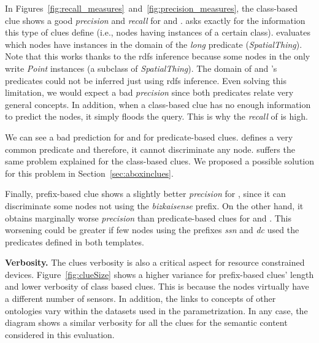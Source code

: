 In Figures~\ref{fig:recall_measures}~and~\ref{fig:precision_measures}, the class-based clue shows a good \emph{precision} and \emph{recall} for \tplone{} and \tpltwo{}.
\tplone{} asks exactly for the information this type of clues define (i.e., nodes having instances of a certain class).
\tpltwo{} evaluates which nodes have instances in the domain of the \emph{long} predicate (\emph{SpatialThing}).
Note that this works thanks to the \acs{rdfs} inference because some nodes in the \Space{} only write \emph{Point} instances (a subclass of \emph{SpatialThing}).
The domain of \tplthree{} and \tplfive{}'s predicates could not be inferred just using \acs{rdfs} inference. %
Even solving this limitation, we would expect a bad \emph{precision} since both predicates relate very general concepts.
In addition, when a class-based clue has no enough information to predict the nodes, it simply floods the query.
This is why the \emph{recall} of \tplfour{} is high.





We can see a bad prediction for \tplone{} and \tplfour{} for predicate-based clues.
\tplone{} defines a very common predicate and therefore, it cannot discriminate any node.
\tplfour{} suffers the same problem explained for the class-based clues.
We proposed a possible solution for this problem in Section~\ref{sec:aboxinclues}.

Finally, prefix-based clue shows a slightly better \emph{precision} for \tplfour{}, since it can discriminate some nodes not using the \emph{bizkaisense} prefix.
On the other hand, it obtains marginally worse \emph{precision} than predicate-based clues for \tplthree{} and \tplfive{}.
This worsening could be greater if few nodes using the prefixes \emph{ssn} and \emph{dc} used the predicates defined in both templates.

\medskip

\noindent\textbf{Verbosity.}
The clues verbosity is also a critical aspect for resource constrained devices.
Figure~\ref{fig:clueSize} shows a higher variance for prefix-based clues' length and lower verbosity of class based clues.
This is because the nodes virtually have a different number of sensors.
In addition, the links to concepts of other ontologies vary within the datasets used in the parametrization.
In any case, the diagram shows a similar verbosity for all the clues for the semantic content considered in this evaluation. %


